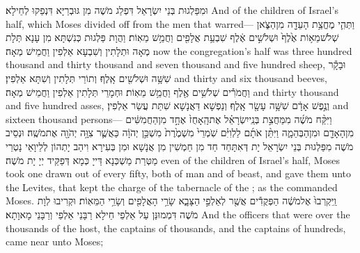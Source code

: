 {וּמִפַּלְגוּת בְּנֵי יִשְׂרָאֵל דִּפְלַג מֹשֶׁה מִן גּוּבְרַיָּא דִּנְפַקוּ לְחֵילָא׃}
{And of the children of Israel’s half, which Moses divided off from the men that warred—}{}
{וַתְּהִ֛י מֶחֱצַ֥ת הָעֵדָ֖ה מִן\maqqaf הַצֹּ֑אן שְׁלֹשׁ\maqqaf מֵא֥וֹת אֶ֙לֶף֙ וּשְׁלֹשִׁ֣ים אֶ֔לֶף שִׁבְעַ֥ת אֲלָפִ֖ים וַחֲמֵ֥שׁ מֵאֽוֹת׃}
{וַהֲוָת פַּלְגוּת כְּנִשְׁתָּא מִן עָנָא תְּלָת מְאָה וּתְלָתִין וְשִׁבְעָא אַלְפִין וַחֲמֵישׁ מְאָה׃}
{now the congregation’s half was three hundred thousand and thirty thousand and seven thousand and five hundred sheep,}{}
{וּבָקָ֕ר שִׁשָּׁ֥ה וּשְׁלֹשִׁ֖ים אָֽלֶף׃}
{וְתוֹרֵי תְּלָתִין וְשִׁתָּא אַלְפִין׃}
{and thirty and six thousand beeves,}{}
{וַחֲמֹרִ֕ים שְׁלֹשִׁ֥ים אֶ֖לֶף וַחֲמֵ֥שׁ מֵאֽוֹת׃}
{וּחְמָרֵי תְּלָתִין אַלְפִין וַחֲמֵישׁ מְאָה׃}
{and thirty thousand and five hundred asses,}{}
{וְנֶ֣פֶשׁ אָדָ֔ם שִׁשָּׁ֥ה עָשָׂ֖ר אָֽלֶף׃}
{וְנַפְשָׁא דַּאֲנָשָׁא שִׁתַּת עֲשַׂר אַלְפִין׃}
{and sixteen thousand persons—}{}
{וַיִּקַּ֨ח מֹשֶׁ֜ה מִמַּחֲצִ֣ת בְּנֵֽי\maqqaf יִשְׂרָאֵ֗ל אֶת\maqqaf הָֽאָחֻז֙ אֶחָ֣ד מִן\maqqaf הַחֲמִשִּׁ֔ים מִן\maqqaf הָאָדָ֖ם וּמִן\maqqaf הַבְּהֵמָ֑ה וַיִּתֵּ֨ן אֹתָ֜ם לַלְוִיִּ֗ם שֹֽׁמְרֵי֙ מִשְׁמֶ֙רֶת֙ מִשְׁכַּ֣ן יְהֹוָ֔ה כַּאֲשֶׁ֛ר צִוָּ֥ה יְהֹוָ֖ה אֶת\maqqaf מֹשֶֽׁה׃}
{וּנְסֵיב מֹשֶׁה מִפַּלְגוּת בְּנֵי יִשְׂרָאֵל יָת דְּאִתָּחַד חַד מִן חַמְשִׁין מִן אֲנָשָׁא וּמִן בְּעִירָא וִיהַב יָתְהוֹן לְלֵיוָאֵי נָטְרֵי מַטְּרַת מַשְׁכְּנָא דַּייָ כְּמָא דְּפַקֵּיד יְיָ יָת מֹשֶׁה׃}
{even of the children of Israel’s half, Moses took one drawn out of every fifty, both of man and of beast, and gave them unto the Levites, that kept the charge of the tabernacle of the \lord; as the \lord\space commanded Moses.}{}
{וַֽיִּקְרְבוּ֙ אֶל\maqqaf מֹשֶׁ֔ה הַפְּקֻדִ֕ים אֲשֶׁ֖ר לְאַלְפֵ֣י הַצָּבָ֑א שָׂרֵ֥י הָאֲלָפִ֖ים וְשָׂרֵ֥י הַמֵּאֽוֹת׃}
{וּקְרִיבוּ לְוָת מֹשֶׁה דִּמְמוּנַּן עַל אַלְפֵי חֵילָא רַבָּנֵי אַלְפֵי וְרַבָּנֵי מָאוָתָא׃}
{And the officers that were over the thousands of the host, the captains of thousands, and the captains of hundreds, came near unto Moses;}{}
